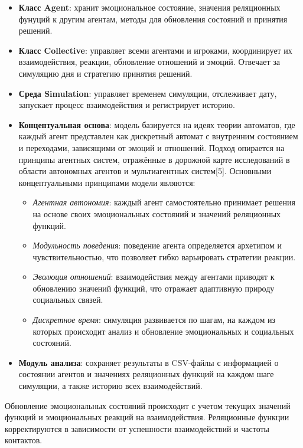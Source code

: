 \documentclass[12pt]{article}
\begin{document}
\begin{itemize}
    \item \textbf{Класс Agent}: хранит эмоциональное состояние, значения реляционных фунуций к другим агентам, методы для обновления состояний и принятия решений.
    \item \textbf{Класс Collective}: управляет всеми агентами и игроками, координирует их взаимодействия, реакции, обновление отношений и эмоций. Отвечает за симуляцию дня и стратегию принятия решений.
    \item \textbf{Среда Simulation}: управляет временем симуляции, отслеживает дату, запускает процесс взаимодействия и регистрирует историю.
    \item \textbf{Концептуальная основа}: модель базируется на идеях теории автоматов, где каждый агент представлен как дискретный автомат с внутренним состоянием и переходами, зависящими от эмоций и отношений. Подход опирается на принципы агентных систем, отражённые в дорожной карте исследований в области автономных агентов и мультиагентных систем[5]. Основными концептуальными принципами модели являются:
    \begin{itemize}
        \item \textit{Агентная автономия}: каждый агент самостоятельно принимает решения на основе своих эмоциональных состояний и значений реляционных функций.
        \item \textit{Модульность поведения}: поведение агента определяется архетипом и чувствительностью, что позволяет гибко варьировать стратегии реакции.
        \item \textit{Эволюция отношений}: взаимодействия между агентами приводят к обновлению значений функций, что отражает адаптивную природу социальных связей.
        \item \textit{Дискретное время}: симуляция развивается по шагам, на каждом из которых происходит анализ и обновление эмоциональных и социальных состояний.
    \end{itemize}
    \item \textbf{Модуль анализа}: сохраняет результаты в CSV-файлы с информацией о состоянии агентов и значениях реляционных функций на каждом шаге симуляции, а также историю всех взаимодействий.
\end{itemize}

Обновление эмоциональных состояний происходит с учетом текущих значений функций и эмоциональных реакций на взаимодействия. Реляционные функции корректируются в зависимости от успешности взаимодействий и частоты контактов.
\end{document}
